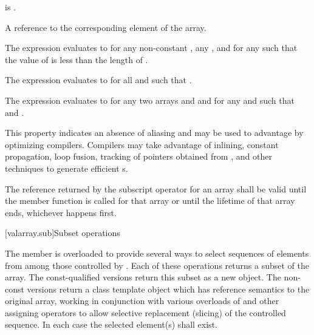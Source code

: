 \begin{itemdescr}
\pnum
\expects
{} is .

\pnum
\returns
A reference to the corresponding element of the array.
\begin{note}
The expression 
evaluates to  for any non-constant ,
any , and for any 
such that the value of  is less than the length of .
\end{note}

\pnum
\remarks
The expression 
evaluates to  for all  and 
such that .

\pnum
The expression 
evaluates to  for any two arrays
 and  and for any
 and 
such that 
and .
\begin{note}
This property indicates an absence of aliasing and may be used to
advantage by optimizing compilers. Compilers may take advantage
of inlining, constant propagation, loop fusion,
tracking of pointers obtained from
,
and other techniques to generate efficient
s.
\end{note}

\pnum
The reference returned by the subscript operator for an array shall
be valid until the member function
 is called for that array or until the lifetime of
that array ends, whichever happens first.
\end{itemdescr}

[valarray.sub]{Subset operations}

%
\pnum
The member  is overloaded to provide several ways to select
sequences of elements from among those controlled by . Each of these
operations returns a subset of the array. The const-qualified versions return this
subset as a new  object. The non-const versions return a class
template object which has reference semantics to the original array, working in
conjunction with various overloads of  and other assigning
operators to allow selective replacement (slicing) of the controlled sequence.
In each case the selected element(s) shall exist.

